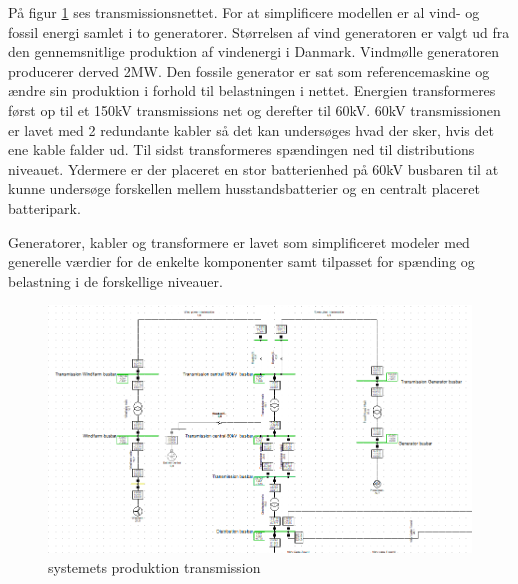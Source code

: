 På figur \ref{fig:SimTrans} ses transmissionsnettet. For at simplificere modellen er al vind- og fossil energi samlet i to generatorer. Størrelsen af vind generatoren er valgt ud fra den gennemsnitlige produktion af vindenergi i Danmark. Vindmølle generatoren producerer derved 2MW. Den fossile generator er sat som referencemaskine og ændre sin produktion i forhold til belastningen i nettet. Energien transformeres først op til et 150kV transmissions net og derefter til 60kV. 60kV transmissionen er lavet med 2 redundante kabler så det kan undersøges hvad der sker, hvis det ene kable falder ud. Til sidst transformeres spændingen ned til distributions niveauet. Ydermere er der placeret en stor batterienhed på 60kV busbaren til at kunne undersøge forskellen mellem husstandsbatterier og en centralt placeret batteripark.

Generatorer, kabler og transformere er lavet som simplificeret modeler med generelle værdier for de enkelte komponenter samt tilpasset for spænding og belastning i de forskellige niveauer.
 

\begin{figure}[H] %
	\centering
	\includegraphics[width=1\textwidth]{figurer/Sim_model_1}
	\caption{systemets produktion transmission}
	\label{fig:SimTrans}
\end{figure}
